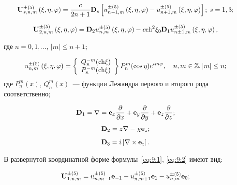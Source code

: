 \begin{equation}
{\bf{U}}_{s,n,m}^{ \pm (5)}\left( {\xi ,\eta ,\varphi } \right) = \frac{c}{{2n + 1}}{{\bf{D}}_s}\left[ {u_{n - 1,m}^{ \pm (5)}\left( {\xi ,\eta ,\varphi } \right) - u_{n + 1,m}^{ \pm (5)}\left( {\xi ,\eta ,\varphi } \right)} \right];\, {\kern 1pt} s = 1,3;
\label{eq:9:1}
\end{equation}

\begin{equation}
{\bf{U}}_{2,n,m}^{ \pm (5)}\left( {\xi ,\eta ,\varphi } \right) = {{\bf{D}}_2}u_{n,m}^{ \pm (5)}\left( {\xi ,\eta ,\varphi } \right) - c{{\mathop{\rm ch}\nolimits} ^2}{\xi _0}{{\bf{D}}_1}u_{n \pm 1,m}^{ \pm (5)}\left( {\xi ,\eta ,\varphi } \right),
\label{eq:9:2}
\end{equation}

\noindent где $n=0,1,\dots$, $|m|\le n+1$;

\begin{equation}
u_{n,m}^{ \pm (5)}\left( {\xi ,\eta ,\varphi } \right) = \left\{ \begin{array}{l}
Q_n^{ - m}({\mathop{\rm ch}\nolimits} \xi )\\
P_n^{ - m}({\mathop{\rm ch}\nolimits} \xi )
\end{array} \right\}P_n^m(\cos \eta ){e^{im\varphi }},\quad n,m \in \mathbb{Z}, |m| \le n;
\end{equation}
где $P_n^m(x)$, $Q_n^m(x)$~--- функции Лежандра первого и второго рода соответственно;

\begin{equation}
{{\bf{D}}_1} = \nabla  = {{\bf{e}}_x}\frac{\partial }{{\partial x}} + {{\bf{e}}_y}\frac{\partial }{{\partial y}} + {{\bf{e}}_z}\frac{\partial }{{\partial z}};
\label{eq:9:23a}
\end{equation}
\begin{equation}
{{\bf{D}}_2} = z\nabla  - \chi {{\bf{e}}_z};
\label{eq:9:23b}
\end{equation}
\begin{equation}
{{\bf{D}}_3} = i\left[ {\nabla  \times {{\bf{e}}_z}} \right].
\label{eq:9:23c}
\end{equation}

В развернутой координатной форме формулы~\eqref{eq:9:1}, \eqref{eq:9:2} имеют вид:

\begin{equation}
{\bf{U}}_{1,n,m}^{ \pm (5)} = u_{n,m - 1}^{ \pm (5)}{{\bf{e}}_{ - 1}} - u_{n,m + 1}^{ \pm (5)}{{\bf{e}}_1} - u_{n,m}^{ \pm (5)}{{\bf{e}}_0};
\end{equation}


